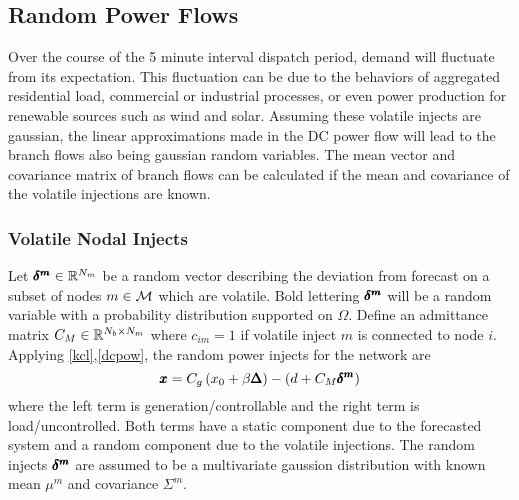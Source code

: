 \subsection{Random Power Flows}
Over the course of the 5 minute interval dispatch period, demand will fluctuate from its expectation.  This  fluctuation can be due to the behaviors of aggregated residential load, commercial or industrial processes, or even power production for renewable sources such as wind and solar.  Assuming these volatile injects are gaussian, the linear approximations made in the DC power flow will lead to the branch flows also being gaussian random variables.  The mean vector and covariance matrix of branch flows can be calculated if the mean and covariance of the volatile injections are known.
\subsubsection*{Volatile Nodal Injects}
Let $\pmb{\delta^m} \in \mathbb{R}^{N_m}$ be a random vector describing the deviation from forecast on a subset of nodes $m \in \mathcal{M}$ which are volatile.  Bold lettering $\pmb{\delta^m}$ will be a random variable with a probability distribution supported on $\Omega$.  Define an admittance matrix $C_M \in \mathbb{R}^{N_b \times N_m}$ where $c_{im}=1$ if volatile inject $m$ is connected to node $i$.  Applying \ref{kcl},\ref{dcpow}, the random power injects for the network are
\begin{equation}\label{rand_inj}
 \pmb{x} = C_g\left(x_0+\beta \pmb{\Delta}\right) - (d + C_M \pmb{\delta^m}) 
\end{equation}
 where the left term is generation/controllable and the right term is load/uncontrolled.  Both terms have a static component due to the forecasted system and a random component due to the volatile injections.  The random injects $\pmb{\delta^m}$ are assumed to be a multivariate gaussion distribution with known mean $\mu^m$ and covariance $\Sigma^m$.  

